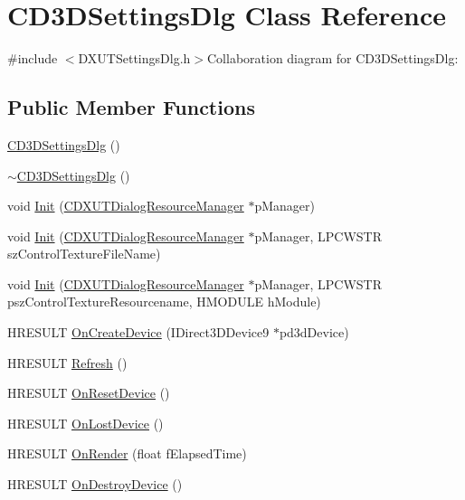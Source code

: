 \hypertarget{class_c_d3_d_settings_dlg}{
\section{CD3DSettingsDlg Class Reference}
\label{class_c_d3_d_settings_dlg}
}


{\ttfamily \#include $<$DXUTSettingsDlg.h$>$}Collaboration diagram for CD3DSettingsDlg:\subsection*{Public Member Functions}
\begin{DoxyCompactItemize}
\item 
\hyperlink{class_c_d3_d_settings_dlg_acbdec2882322c04fb6088e80721e6d96}{CD3DSettingsDlg} ()
\item 
\hyperlink{class_c_d3_d_settings_dlg_a79c0f732c733d7a06086a2b1d313b7ac}{$\sim$CD3DSettingsDlg} ()
\item 
void \hyperlink{class_c_d3_d_settings_dlg_ad729e65b02d7da4db7672d29d0d7c935}{Init} (\hyperlink{class_c_d_x_u_t_dialog_resource_manager}{CDXUTDialogResourceManager} $\ast$pManager)
\item 
void \hyperlink{class_c_d3_d_settings_dlg_a3a9d268771e11c24188ad4be4185ede3}{Init} (\hyperlink{class_c_d_x_u_t_dialog_resource_manager}{CDXUTDialogResourceManager} $\ast$pManager, LPCWSTR szControlTextureFileName)
\item 
void \hyperlink{class_c_d3_d_settings_dlg_acbf3721135cc7408a8aeb0cc0340d3a8}{Init} (\hyperlink{class_c_d_x_u_t_dialog_resource_manager}{CDXUTDialogResourceManager} $\ast$pManager, LPCWSTR pszControlTextureResourcename, HMODULE hModule)
\item 
HRESULT \hyperlink{class_c_d3_d_settings_dlg_afc71a070eaf9072f4dc3253aac1baddf}{OnCreateDevice} (IDirect3DDevice9 $\ast$pd3dDevice)
\item 
HRESULT \hyperlink{class_c_d3_d_settings_dlg_ae7602b7c1fc461fdc997c40de550ccbe}{Refresh} ()
\item 
HRESULT \hyperlink{class_c_d3_d_settings_dlg_af22c2f99599fd86040c834ca9757b3e6}{OnResetDevice} ()
\item 
HRESULT \hyperlink{class_c_d3_d_settings_dlg_a9cf75243457ad7f0b8c179bacc93cbdc}{OnLostDevice} ()
\item 
HRESULT \hyperlink{class_c_d3_d_settings_dlg_a395d09a31ad85f38fa495311629bf347}{OnRender} (float fElapsedTime)
\item 
HRESULT \hyperlink{class_c_d3_d_settings_dlg_a00d400903b65fa5d55b7e7efb716bb8e}{OnDestroyDevice} ()

\end{DoxyCompactItemize}

